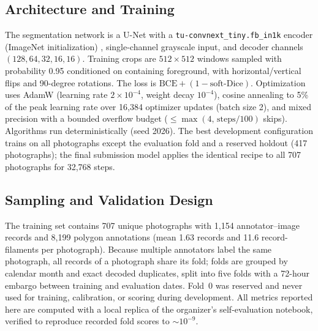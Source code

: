 \documentclass[sigconf]{acmart}
\begin{document}
\subsection{Architecture and Training}
The segmentation network is a U-Net with a \texttt{tu-convnext\_tiny.fb\_in1k} encoder (ImageNet initialization) \cite{ronneberger2015u,liu2022convnext}, single-channel grayscale input, and decoder channels $(128,64,32,16,16)$.
Training crops are $512\times512$ windows sampled with probability 0.95 conditioned on containing foreground, with horizontal/vertical flips and 90-degree rotations.
The loss is $\mathrm{BCE}+(1-\mathrm{soft\text{-}Dice})$.
Optimization uses AdamW (learning rate $2\times10^{-4}$, weight decay $10^{-4}$), cosine annealing to 5\% of the peak learning rate over 16{,}384 optimizer updates (batch size 2), and mixed precision with a bounded overflow budget ($\le\max(4,\,\text{steps}/100)$ skips).
Algorithms run deterministically (seed 2026).
The best development configuration trains on all photographs except the evaluation fold and a reserved holdout (417 photographs); the final submission model applies the identical recipe to all 707 photographs for 32{,}768 steps.

\subsection{Sampling and Validation Design}
The training set contains 707 unique photographs with 1{,}154 annotator--image records and 8{,}199 polygon annotations (mean 1.63 records and 11.6 record-filaments per photograph).
Because multiple annotators label the same photograph, all records of a photograph share its fold; folds are grouped by calendar month and exact decoded duplicates, split into five folds with a 72-hour embargo between training and evaluation dates.
Fold~0 was reserved and never used for training, calibration, or scoring during development.
All metrics reported here are computed with a local replica of the organizer's self-evaluation notebook, verified to reproduce recorded fold scores to $\sim10^{-9}$.
\end{document}
